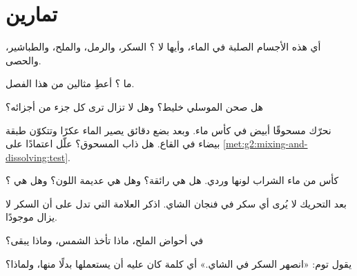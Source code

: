 \section{تمارين}

\begin{exercise}[$\star$]\label{exo:g2:mixing-and-dissolving:1}
أي هذه الأجسام الصلبة  في الماء، وأيها لا ؟ السكر، والرمل،
والملح، والطباشير، والحصى.
\end{exercise}

\begin{exercise}[$\star$]\label{exo:g2:mixing-and-dissolving:2}
ما ؟ أعطِ مثالين من هذا الفصل.
\end{exercise}

\begin{exercise}[$\star$]\label{exo:g2:mixing-and-dissolving:3}
هل صحن الموسلي خليط؟ وهل لا تزال ترى كل جزء من أجزائه؟
\end{exercise}

\begin{exercise}[$\star$]\label{exo:g2:mixing-and-dissolving:4}
نحرّك مسحوقًا أبيض في كأس ماء. وبعد بضع دقائق يصير الماء عكرًا
وتتكوّن طبقة بيضاء في القاع. هل ذاب المسحوق؟ علّل اعتمادًا على
\cref{met:g2:mixing-and-dissolving:test}.
\end{exercise}

\begin{exercise}[$\star$]\label{exo:g2:mixing-and-dissolving:5}
كأس من ماء الشراب لونها وردي. هل هي رائقة؟ وهل هي عديمة اللون؟ وهل
هي ؟
\end{exercise}

\begin{exercise}[$\star$]\label{exo:g2:mixing-and-dissolving:6}
بعد التحريك لا يُرى أي سكر في فنجان الشاي. اذكر العلامة التي تدل على
أن السكر لا يزال موجودًا.
\end{exercise}

\begin{exercise}[$\star$]\label{exo:g2:mixing-and-dissolving:7}
في أحواض الملح، ماذا تأخذ الشمس، وماذا يبقى؟
\end{exercise}

\begin{exercise}[$\star$]\label{exo:g2:mixing-and-dissolving:8}
يقول توم: «انصهر السكر في الشاي.» أي كلمة كان عليه أن يستعملها
بدلًا منها، ولماذا؟
\end{exercise}

